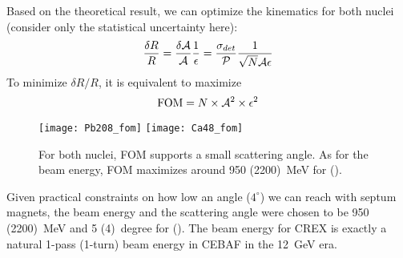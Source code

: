 Based on the theoretical result, we can optimize the kinematics for both nuclei 
(consider only the statistical uncertainty here):
\begin{equation}
    \frac{\delta R}{R} = \frac{\delta \mathcal{A}}{\mathcal{A}} \frac{1}{\epsilon} 
	= \frac{\sigma_{det}}{\mathcal{P}} \frac{1}{\sqrt{N} \mathcal{A} \epsilon}
\end{equation}
To minimize $\delta R/R$, it is equivalent to maximize 
\begin{equation}
    \text{FOM} = N\times \mathcal{A}^2 \times \epsilon^2
\end{equation}
\begin{figure}
    \texttt{[image: Pb208\_fom]}
    \texttt{[image: Ca48\_fom]}
    \caption[FOM]{For both nuclei, FOM supports a small scattering angle. As for the beam energy,
    FOM maximizes around 950 (2200)~MeV for \Pb (\Ca).}
\end{figure}

Given practical constraints on how low an angle ($4^\circ$) we can reach with 
septum magnets, the beam energy and the scattering angle were chosen to be 950 (2200)~MeV
and 5 (4)~degree for \Pb (\Ca). The beam energy for CREX is exactly a natural 1-pass (1-turn) beam
energy in CEBAF in the 12~GeV era.
\begin{comment}
For PREX-II: average sensitivity reduced by 5\% due to ${}^{12}C$ contamination
For CREX: average sensitivity reduced by 10\% due to ${}^{40}Ca$ contamination

While a quartz Cherenkov detector is valued for radiation hardness and insensitivity to soft backgrounds, there is a particular challenge for few GeV electrons. In this energy range, shower fluctuations in a thick or radiated detector significantly degrade energy resolution, while photon statistics degrade the energy resolution for a thin detector. The energy resolution $\Delta E$ at nominal electron energy E increases the statistical error that one would have with infinite resolution $\sigma_0$ to obtain the total statistical error:
$$ \sigma = \sigma_0\sqrt{1+\left(\frac{\Delta E}{E}\right)^2}$$
    
Based on experience in the PREX experiment, we expect a reduction of statistical precision of a factor of 1.06 due to detector resolution.
\end{comment}

